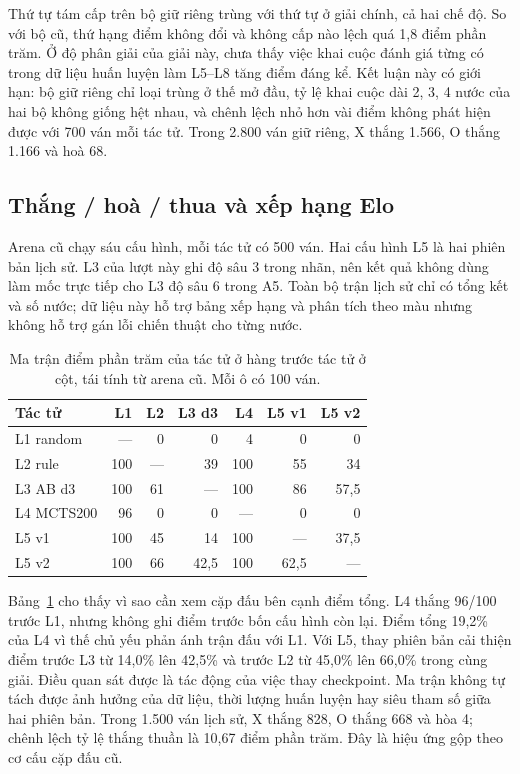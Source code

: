 Thứ tự tám cấp trên bộ giữ riêng trùng với thứ tự ở giải chính, cả hai chế độ. So với bộ cũ, thứ hạng điểm không đổi và không cấp nào lệch quá 1{,}8 điểm phần trăm. Ở độ phân giải của giải này, chưa thấy việc khai cuộc đánh giá từng có trong dữ liệu huấn luyện làm L5--L8 tăng điểm đáng kể. Kết luận này có giới hạn: bộ giữ riêng chỉ loại trùng ở thế mở đầu, tỷ lệ khai cuộc dài 2, 3, 4 nước của hai bộ không giống hệt nhau, và chênh lệch nhỏ hơn vài điểm không phát hiện được với 700 ván mỗi tác tử. Trong 2.800 ván giữ riêng, X thắng 1.566, O thắng 1.166 và hoà 68.

\subsection{Thắng / hoà / thua và xếp hạng Elo}
Arena cũ chạy sáu cấu hình, mỗi tác tử có 500 ván. Hai cấu hình L5 là hai phiên bản lịch sử. L3 của lượt này ghi độ sâu 3 trong nhãn, nên kết quả không dùng làm mốc trực tiếp cho L3 độ sâu 6 trong A5. Toàn bộ trận lịch sử chỉ có tổng kết và số nước; dữ liệu này hỗ trợ bảng xếp hạng và phân tích theo màu nhưng không hỗ trợ gán lỗi chiến thuật cho từng nước.
\begin{table}[H]
\centering
\caption{Điểm tổng của sáu cấu hình trong arena cũ.}
\label{tab:arena-tong}

\end{table}

\begin{table}[H]
\centering\small
\begin{tabular}{@{}lrrrrrr@{}}
\toprule
Tác tử & L1 & L2 & L3 d3 & L4 & L5 v1 & L5 v2 \\
\midrule
L1 random  & --- & 0 & 0 & 4 & 0 & 0 \\
L2 rule    & 100 & --- & 39 & 100 & 55 & 34 \\
L3 AB d3   & 100 & 61 & --- & 100 & 86 & 57,5 \\
L4 MCTS200 & 96 & 0 & 0 & --- & 0 & 0 \\
L5 v1      & 100 & 45 & 14 & 100 & --- & 37,5 \\
L5 v2      & 100 & 66 & 42,5 & 100 & 62,5 & --- \\
\bottomrule
\end{tabular}
\caption{Ma trận điểm phần trăm của tác tử ở hàng trước tác tử ở cột, tái tính từ arena cũ. Mỗi ô có 100 ván.}
\label{tab:arena-lich-su}
\end{table}

Bảng~\ref{tab:arena-lich-su} cho thấy vì sao cần xem cặp đấu bên cạnh điểm tổng.
L4 thắng 96/100 trước L1, nhưng không ghi điểm trước bốn cấu hình còn lại. Điểm tổng
19,2\% của L4 vì thế chủ yếu phản ánh trận đấu với L1. Với L5, thay phiên bản cải thiện
điểm trước L3 từ 14,0\% lên 42,5\% và trước L2 từ 45,0\% lên 66,0\% trong cùng giải.
Điều quan sát được là tác động của việc thay checkpoint. Ma trận không tự tách được
ảnh hưởng của dữ liệu, thời lượng huấn luyện hay siêu tham số giữa hai phiên bản.
Trong 1.500 ván lịch sử, X thắng 828, O thắng 668 và hòa 4; chênh lệch
tỷ lệ thắng thuần là 10,67 điểm phần trăm. Đây là hiệu ứng gộp theo cơ cấu cặp đấu cũ.
